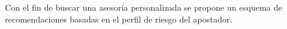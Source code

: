Con el fin de buscar una asesoría personalizada se propone un esquema de recomendaciones basadas en el perfil de riesgo del apostador.
%
%
%
%
%
%
%
%
%
%
%
